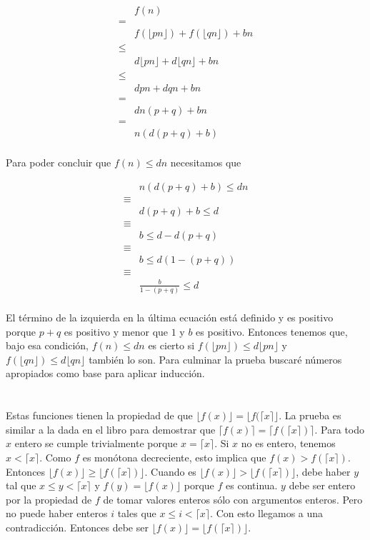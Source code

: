 \documentclass{article}
\newcommand{\piso}[1]{\lfloor #1 \rfloor}
\newcommand{\techo}[1]{\lceil #1 \rceil}
\begin{document}
\begin{align*}
 & f(n) \\
 = & \\
 & f(\piso{pn}) + f(\piso{qn}) + bn \\
 \leq & \\
 & d\piso{pn} + d\piso{qn} + bn \\
 \leq & \\
 & dpn + dqn + bn \\
 = & \\
 & dn(p+q) + bn \\
 = & \\
 & n(d(p+q) + b) \\
\end{align*}

Para poder concluir que $f(n) \leq dn$ necesitamos que

\begin{align*}
 & n(d(p+q) + b) \leq dn \\
 \equiv & \\
 & d(p+q) + b \leq d \\
 \equiv & \\
 & b \leq d - d(p+q) \\
 \equiv & \\
 & b \leq d(1 - (p+q)) \\
 \equiv & \\
 & \frac{b}{1-(p+q)} \leq d \\
\end{align*}

El término de la izquierda en la última ecuación está definido y es positivo
porque $p+q$ es positivo y menor que $1$ y $b$ es positivo. Entonces tenemos
que, bajo esa condición, $f(n) \leq dn$ es cierto si
$f(\piso{pn}) \leq d\piso{pn}$ y $f(\piso{qn}) \leq d\piso{qn}$ también lo son.
Para culminar la prueba buscaré números apropiados como base para aplicar
inducción.

\section{}

Estas funciones tienen la propiedad de que $\piso{f(x)} = \piso{f(\techo{x}}$.
La prueba es similar a la dada en el libro para demostrar que
$\techo{f(x)} = \techo{f(\techo{x})}$.
Para todo $x$ entero se cumple trivialmente porque $x = \techo{x}$. Si $x$ no
es entero, tenemos $x < \techo{x}$. Como $f$ es monótona decreciente, esto
implica que $f(x) > f(\techo{x})$. Entonces
$\piso{f(x)} \geq \piso{f(\techo{x})}$.
Cuando es $\piso{f(x)} > \piso{f(\techo{x})}$, debe haber $y$ tal que
$x \leq y < \techo{x}$ y $f(y) = \piso{f(x)}$ porque $f$ es continua.
$y$ debe
ser entero por la propiedad
de $f$ de tomar valores enteros sólo con argumentos enteros.
Pero no puede haber enteros $i$ tales que $x \leq i < \techo{x}$. 
Con esto llegamos
a una contradicción.
Entonces debe ser $\piso{f(x)} = \piso{f(\techo{x})}$.

\section{}

\section{}
\end{document}
